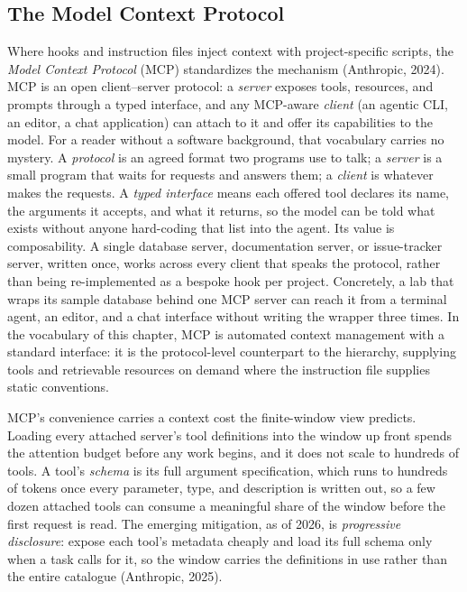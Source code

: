 \subsection{The Model Context Protocol}

Where hooks and instruction files inject context with project-specific scripts, the \emph{Model Context Protocol} (MCP) standardizes the mechanism (Anthropic, 2024).
MCP is an open client--server protocol: a \emph{server} exposes tools, resources, and prompts through a typed interface, and any MCP-aware \emph{client} (an agentic CLI, an editor, a chat application) can attach to it and offer its capabilities to the model.
For a reader without a software background, that vocabulary carries no mystery.
A \emph{protocol} is an agreed format two programs use to talk; a \emph{server} is a small program that waits for requests and answers them; a \emph{client} is whatever makes the requests.
A \emph{typed interface} means each offered tool declares its name, the arguments it accepts, and what it returns, so the model can be told what exists without anyone hard-coding that list into the agent.
Its value is composability.
A single database server, documentation server, or issue-tracker server, written once, works across every client that speaks the protocol, rather than being re-implemented as a bespoke hook per project.
Concretely, a lab that wraps its sample database behind one MCP server can reach it from a terminal agent, an editor, and a chat interface without writing the wrapper three times.
In the vocabulary of this chapter, MCP is automated context management with a standard interface: it is the protocol-level counterpart to the  hierarchy, supplying tools and retrievable resources on demand where the instruction file supplies static conventions.

\begin{remark}
MCP's convenience carries a context cost the finite-window view predicts.
Loading every attached server's tool definitions into the window up front spends the attention budget before any work begins, and it does not scale to hundreds of tools.
A tool's \emph{schema} is its full argument specification, which runs to hundreds of tokens once every parameter, type, and description is written out, so a few dozen attached tools can consume a meaningful share of the window before the first request is read.
The emerging mitigation, as of 2026, is \emph{progressive disclosure}: expose each tool's metadata cheaply and load its full schema only when a task calls for it, so the window carries the definitions in use rather than the entire catalogue (Anthropic, 2025).
\end{remark}

